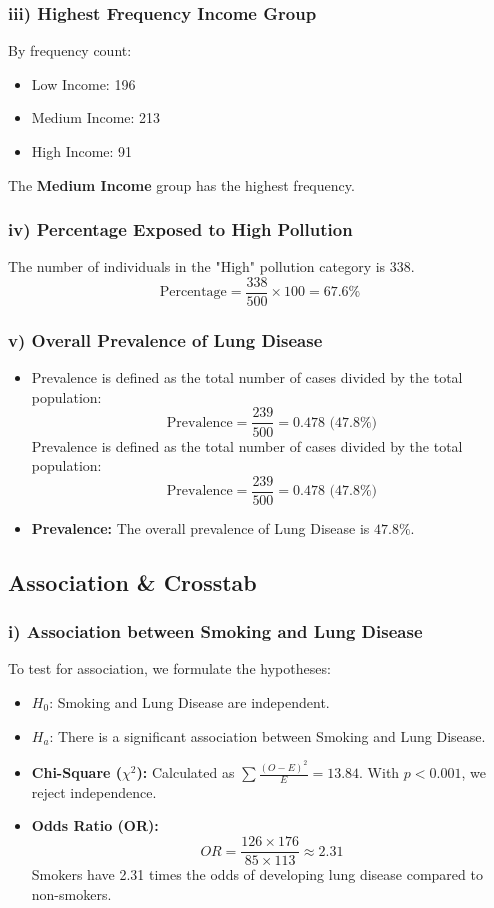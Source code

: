 \documentclass[12pt, a4paper]{article}
\begin{document}
\subsubsection{iii) Highest Frequency Income Group}
By frequency count:
\begin{itemize}
    \item Low Income: 196
    \item Medium Income: 213
    \item High Income: 91
\end{itemize}
The \textbf{Medium Income} group has the highest frequency.

\subsubsection{iv) Percentage Exposed to High Pollution}
The number of individuals in the "High" pollution category is 338.
\[ \text{Percentage} = \frac{338}{500} \times 100 = 67.6\% \]
\subsubsection{v) Overall Prevalence of Lung Disease}
\begin{itemize}
\item Prevalence is defined as the total number of cases divided by the total population:
\[ \text{Prevalence} = \frac{239}{500} = 0.478 \text{ (47.8\%)} \]
Prevalence is defined as the total number of cases divided by the total population:
\[ \text{Prevalence} = \frac{239}{500} = 0.478 \text{ (47.8\%)} \]
\item \textbf{Prevalence:} The overall prevalence of Lung Disease is $47.8\%$.
\end{itemize}

\subsection{Association \& Crosstab}

\subsubsection{i) Association between Smoking and Lung Disease}
To test for association, we formulate the hypotheses:
\begin{itemize}
    \item $H_0$: Smoking and Lung Disease are independent.
    \item $H_a$: There is a significant association between Smoking and Lung Disease.

    \item \textbf{Chi-Square ($\chi^2$):} Calculated as $\sum \frac{(O-E)^2}{E} = 13.84$. With $p < 0.001$, we reject independence.
    \item \textbf{Odds Ratio (OR):} 
    \[ OR = \frac{126 \times 176}{85 \times 113} \approx 2.31 \]
    Smokers have 2.31 times the odds of developing lung disease compared to non-smokers.

\end{itemize}
\end{document}
